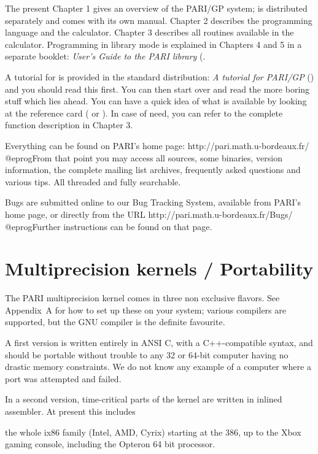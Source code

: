 The present Chapter 1 gives an overview of the PARI/GP system;  is
distributed separately and comes with its own manual. Chapter 2 describes the
 programming language and the  calculator. Chapter 3
describes all routines available in the calculator. Programming in library
mode is explained in Chapters 4 and 5 in a separate booklet: \emph{User's
Guide to the PARI library} (.

A tutorial for  is provided in the standard distribution: \emph{A
tutorial for PARI/GP} () and you should read this first.
You can then start over and read the more boring stuff which lies ahead. You
can have a quick idea of what is available by looking at the 
reference card ( or ). In case of need, you
can refer to the complete function description in Chapter 3.

 Everything can be found on
PARI's home page:
\bprog
  http://pari.math.u-bordeaux.fr/
@eprog\noindent From that point you may access all sources, some binaries,
version information, the complete mailing list archives, frequently asked
questions and various tips. All threaded and fully searchable.

 Bugs are submitted online to our Bug
Tracking System, available from PARI's home page, or directly from the URL
\bprog
  http://pari.math.u-bordeaux.fr/Bugs/
@eprog\noindent Further instructions can be found on that page.

\section{Multiprecision kernels / Portability}

The PARI multiprecision kernel comes in three non exclusive flavors. See
Appendix~A for how to set up these on your system; various compilers are
supported, but the GNU  compiler is the definite favourite.

A first version is written entirely in ANSI C, with a C++-compatible syntax,
and should be portable without trouble to any 32 or 64-bit computer having no
drastic memory constraints. We do not know any example of a computer where a
port was attempted and failed.

In a second version, time-critical parts of the kernel are written in
inlined assembler. At present this includes

\item the whole ix86 family (Intel, AMD, Cyrix) starting at the 386, up to
the Xbox gaming console, including the Opteron 64 bit processor.

